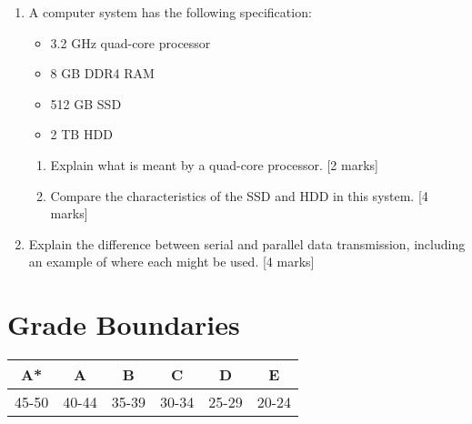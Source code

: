 \documentclass{article}
\begin{document}
\begin{enumerate}
\item A computer system has the following specification:
\begin{itemize}
    \item 3.2 GHz quad-core processor
    \item 8 GB DDR4 RAM
    \item 512 GB SSD
    \item 2 TB HDD
\end{itemize}

\begin{enumerate}[label=(\alph*)]
    \item Explain what is meant by a quad-core processor. [2 marks]
    \item Compare the characteristics of the SSD and HDD in this system. [4 marks]
\end{enumerate}

\item Explain the difference between serial and parallel data transmission, including an example of where each might be used. [4 marks]

\end{enumerate}

\newpage

\section*{Grade Boundaries}
\begin{center}
\begin{tabular}{|c|c|c|c|c|c|}
\hline
A* & A & B & C & D & E \\
\hline
45-50 & 40-44 & 35-39 & 30-34 & 25-29 & 20-24 \\
\hline
\end{tabular}
\end{center}
\end{document}
